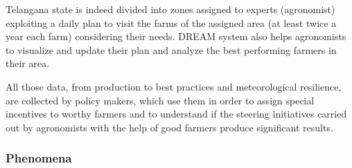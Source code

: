 \documentclass{article}
\begin{document}
Telangana state is indeed divided into zones assigned to experts (agronomist) exploiting a daily plan to visit the farms of the assigned area (at least twice a year each farm) considering their needs. DREAM system also helps agronomists to visualize and update their plan and analyze the best performing farmers in their area.

All those data, from production to best practices and meteorological resilience, are collected by policy makers, which use them in order to assign special incentives to worthy farmers and to understand if the steering initiatives carried out by agronomists with the help of good farmers produce significant results.


\newpage

\subsubsection{Phenomena}
\end{document}
